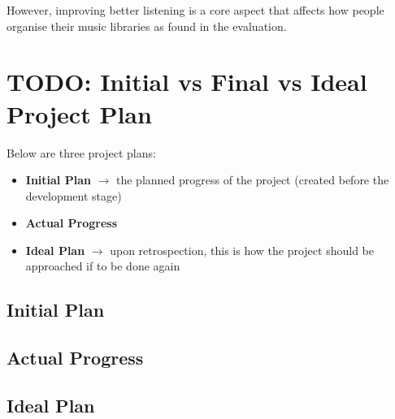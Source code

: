 However, improving better listening is a core aspect that affects how people organise their music libraries as found in the evaluation.

\section{TODO: Initial vs Final vs Ideal Project Plan}
Below are three project plans:\begin{itemize}
    \item \textbf{Initial Plan} \(\to\) the planned progress of the project (created before the development stage)
    \item \textbf{Actual Progress}
    \item \textbf{Ideal Plan} \(\to\) upon retrospection, this is how the project should be approached if to be done again
\end{itemize}

\subsection{Initial Plan}%

\subsection{Actual Progress}%

\subsection{Ideal Plan}%
